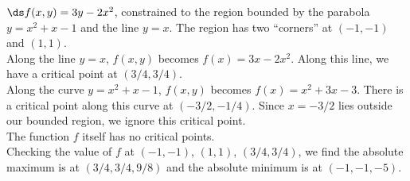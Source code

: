 {$\ds f(x,y) = 3y-2x^2$, constrained to the region bounded by the parabola $y=x^2+x-1$ and the line $y=x$.
}
{The region has two ``corners'' at $(-1,-1)$ and $(1,1)$.\\
Along the line $y=x$, $f(x,y)$ becomes $f(x) = 3x-2x^2$. Along this line, we have a critical point at $(3/4,3/4)$.\\
Along the curve $y=x^2+x-1$, $f(x,y)$ becomes $f(x) =x^2+3x-3$. There is a critical point along this curve at $(-3/2, -1/4)$. Since $x=-3/2$ lies outside our bounded region, we ignore this critical point.\\
The function $f$ itself has no critical points. \\
Checking the value of $f$ at $(-1,-1)$, $(1,1)$, $(3/4,3/4)$, we find the absolute maximum is at $(3/4,3/4,9/8)$ and the absolute minimum is at $(-1,-1,-5)$.
}